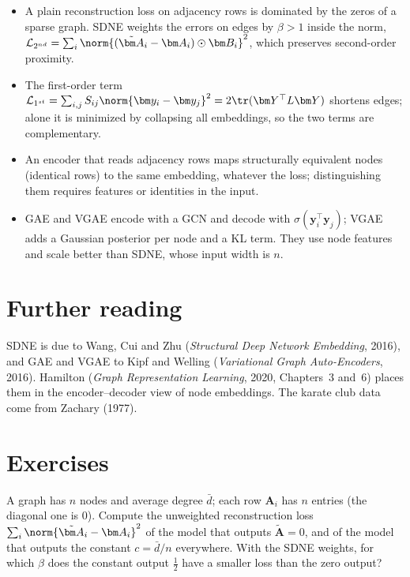 \begin{notechapter}
\begin{chaptersummary}
\begin{itemize}
\item A plain reconstruction loss on adjacency rows is dominated by the zeros of a sparse graph. SDNE weights the errors on edges by $\beta > 1$ inside the norm, $\mathcal L_{2^{nd}} = \sum_i\norm{(\tilde{\bm A}_i - \bm A_i)\odot\bm B_i}^2$, which preserves second-order proximity.
\item The first-order term $\mathcal L_{1^{st}} = \sum_{i,j}S_{ij}\norm{\bm y_i - \bm y_j}^2 = 2\tr(\bm Y^\top L\bm Y)$ shortens edges; alone it is minimized by collapsing all embeddings, so the two terms are complementary.
\item An encoder that reads adjacency rows maps structurally equivalent nodes (identical rows) to the same embedding, whatever the loss; distinguishing them requires features or identities in the input.
\item GAE and VGAE encode with a GCN and decode with $\sigma(\bm y_i^\top\bm y_j)$; VGAE adds a Gaussian posterior per node and a KL term. They use node features and scale better than SDNE, whose input width is $n$.
\end{itemize}
\end{chaptersummary}

\section*{Further reading}
SDNE is due to Wang, Cui and Zhu (\emph{Structural Deep Network Embedding}, 2016), and GAE and VGAE to Kipf and Welling (\emph{Variational Graph Auto-Encoders}, 2016). Hamilton (\emph{Graph Representation Learning}, 2020, Chapters~3 and~6) places them in the encoder--decoder view of node embeddings. The karate club data come from Zachary (1977).

\section*{Exercises}

\begin{exercise}\label{graph-autoencoders:exr:1}
A graph has $n$ nodes and average degree $\bar d$; each row $\bm A_i$ has $n$ entries (the diagonal one is $0$). Compute the unweighted reconstruction loss $\sum_i\norm{\tilde{\bm A}_i - \bm A_i}^2$ of the model that outputs $\tilde{\bm A} = 0$, and of the model that outputs the constant $c = \bar d/n$ everywhere. With the SDNE weights, for which $\beta$ does the constant output $\frac12$ have a smaller loss than the zero output?
\end{exercise}


\end{notechapter}
